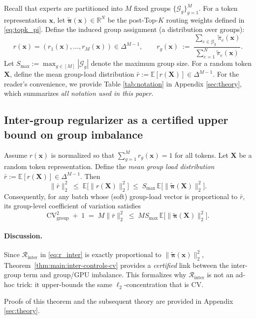 \documentclass[sigconf,nonacm]{acmart}
\begin{document}
Recall that experts are partitioned into $M$ fixed groups $\{\mathcal{G}_g\}_{g=1}^M$.
For a token representation $\mathbf{x}$, let $\widetilde{\bm{\pi}}(\mathbf{x})\in\mathbb{R}^N$ be the post-Top-$K$ routing weights defined in \eqref{eq:topk_pi}.
Define the induced group assignment (a distribution over groups):
\[
r(\mathbf{x})=(r_1(\mathbf{x}),\dots,r_M(\mathbf{x}))\in\Delta^{M-1},
\qquad
r_g(\mathbf{x})
\;:=\;
\frac{\sum_{e\in\mathcal{G}_g}\widetilde{\pi}_e(\mathbf{x})}{\sum_{e=1}^N \widetilde{\pi}_e(\mathbf{x})}.
\]
Let $S_{\max}:=\max_{g\in[M]}|\mathcal{G}_g|$ denote the maximum group size.
For a random token $\mathbf{X}$, define the mean group-load distribution $\bar r:=\mathbb{E}[r(\mathbf{X})]\in\Delta^{M-1}$.
For the reader’s convenience, we provide Table \ref{tab:notation} in Appendix \ref{sec:theory}, which summarizes \emph{all notation used in this paper}.
\subsection{Inter-group regularizer as a certified upper bound on group imbalance}
\label{sec:main:theory-inter}


\begin{theorem}
\label{thm:main:inter-controls-cv}
Assume $r(\mathbf{x})$ is normalized so that $\sum_{g=1}^M r_g(\mathbf{x})=1$ for all tokens.
Let $\mathbf{X}$ be a random token representation.
Define the \emph{mean group load distribution} $\bar r := \mathbb{E}[r(\mathbf{X})]\in\Delta^{M-1}$.
Then
\[
\|\bar r\|_2^2
\;\le\;
\mathbb{E}\bigl[\|r(\mathbf{X})\|_2^2\bigr]
\;\le\;
S_{\max}\,\mathbb{E}\bigl[\|\widetilde{\bm{\pi}}(\mathbf{X})\|_2^2\bigr].
\]
Consequently, for any batch whose (soft) group-load vector is proportional to $\bar r$, its group-level coefficient of
variation satisfies
\[
\mathrm{CV}_{\text{group}}^2 \;+\; 1
\;=\;
M\|\bar r\|_2^2
\;\le\;
M S_{\max}\,\mathbb{E}\bigl[\|\widetilde{\bm{\pi}}(\mathbf{X})\|_2^2\bigr].
\]
\end{theorem}

\begin{tcolorbox}[colback=gray!0,colframe=gray!30,arc=2mm]
\paragraph{Discussion.}
Since $\mathcal{R}_{\text{inter}}$ in \eqref{eq:r_inter} is exactly proportional to
$\|\widetilde{\bm{\pi}}(\mathbf{x})\|_2^2$,
Theorem~\ref{thm:main:inter-controls-cv} provides a \emph{certified} link between the inter-group term and group/GPU imbalance.
This formalizes why $\mathcal{R}_{\text{inter}}$ is not an ad-hoc trick:
it upper-bounds the same $\ell_2$-concentration that is CV.
\end{tcolorbox}
Proofs of this theorem and the subsequent theory are provided in Appendix \ref{sec:theory}.
\end{document}
